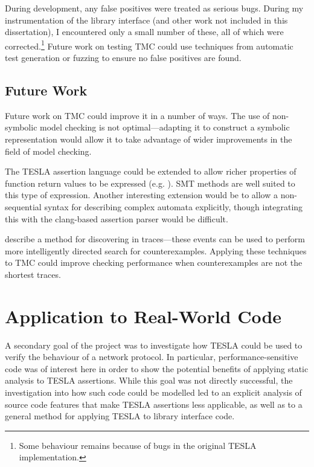 During development, any false positives were treated as serious bugs. During my
instrumentation of the \lwip{} library interface (and other work not included in
this dissertation), I encountered only a small number of these, all of which
were corrected.\footnote{Some  behaviour remains because of bugs
in the original TESLA implementation.} Future work on testing TMC could use
techniques from automatic test generation or fuzzing to ensure no false
positives are found.

\subsection{Future Work}

Future work on TMC could improve it in a number of ways. The use of non-symbolic
model checking is not optimal---adapting it to construct a symbolic
representation would allow it to take advantage of wider improvements in the
field of model checking. 

The TESLA assertion language could be extended to allow richer properties of
function return values to be expressed (e.g. ). SMT methods are well suited to this type
of expression. Another interesting extension would be to allow a non-sequential
syntax for describing complex automata explicitly, though integrating this with
the clang-based assertion parser would be difficult.

\textcite{kashyap_producing_2008} describe a method for discovering
 in traces---these events can be used to perform more
intelligently directed search for counterexamples. Applying these techniques to
TMC could improve checking performance when counterexamples are not the shortest
traces.

\section{Application to Real-World Code} \label{sec:eval-app}

A secondary goal of the project was to investigate how TESLA could be used to
verify the behaviour of a network protocol. In particular, performance-sensitive
code was of interest here in order to show the potential benefits of applying
static analysis to TESLA assertions. While this goal was not directly
successful, the investigation into how such code could be modelled led to an
explicit analysis of source code features that make TESLA assertions less
applicable, as well as to a general method for applying TESLA to library
interface code.

